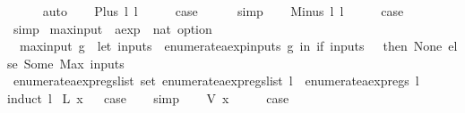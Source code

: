 \begin{isabellebody}
\ \ \ \ \isamarkupfalse%
\ auto\isanewline
{}\isamarkupfalse%
\isanewline
\ \ \isamarkupfalse%
\ {\isacharparenleft}Plus\ l{}\ l{}{\isacharparenright}\isanewline
\ \ \isamarkupfalse%
\ \isamarkupfalse%
\ {\isacharquery}case\isanewline
\ \ \ \ \isamarkupfalse%
\ simp\isanewline
{}\isamarkupfalse%
\isanewline
\ \ \isamarkupfalse%
\ {\isacharparenleft}Minus\ l{}\ l{}{\isacharparenright}\isanewline
\ \ \isamarkupfalse%
\ \isamarkupfalse%
\ {\isacharquery}case\isanewline
\ \ \ \ \isamarkupfalse%
\ simp\isanewline
{}\isamarkupfalse%
%
\endisatagproof
{\isafoldproof}%
%
\isadelimproof
\isanewline
%
\endisadelimproof
\isanewline
{}\isamarkupfalse%
\ max{\isacharunderscore}input\ {\isacharcolon}{\isacharcolon}\ {\isachardoublequoteopen}aexp\ {\isasymRightarrow}\ nat\ option{\isachardoublequoteclose}\ \isanewline
\ \ {\isachardoublequoteopen}max{\isacharunderscore}input\ g\ {\isacharequal}\ {\isacharparenleft}let\ inputs\ {\isacharequal}\ {\isacharparenleft}enumerate{\isacharunderscore}aexp{\isacharunderscore}inputs\ g{\isacharparenright}\ in\ if\ inputs\ {\isacharequal}\ {\isacharbraceleft}{\isacharbraceright}\ then\ None\ else\ Some\ {\isacharparenleft}Max\ inputs{\isacharparenright}{\isacharparenright}{\isachardoublequoteclose}\isanewline
\isanewline
{}\isamarkupfalse%
\ enumerate{\isacharunderscore}aexp{\isacharunderscore}regs{\isacharunderscore}list{\isacharcolon}\ {\isachardoublequoteopen}set\ {\isacharparenleft}enumerate{\isacharunderscore}aexp{\isacharunderscore}regs{\isacharunderscore}list\ l{\isacharparenright}\ {\isacharequal}\ enumerate{\isacharunderscore}aexp{\isacharunderscore}regs\ l{\isachardoublequoteclose}\isanewline
%
\isadelimproof
%
\endisadelimproof
%
\isatagproof
{}\isamarkupfalse%
{\isacharparenleft}induct\ l{\isacharparenright}\isanewline
{}\isamarkupfalse%
\ {\isacharparenleft}L\ x{\isacharparenright}\isanewline
{}\isamarkupfalse%
\ \isamarkupfalse%
\ {\isacharquery}case\isanewline
\ \ \isamarkupfalse%
\ simp\isanewline
{}\isamarkupfalse%
\isanewline
\ \ \isamarkupfalse%
\ {\isacharparenleft}V\ x{\isacharparenright}\isanewline
\ \ \isamarkupfalse%
\ \isamarkupfalse%
\ {\isacharquery}case\isanewline
\ \ \ \ \isamarkupfalse%

\end{isabellebody}
